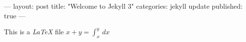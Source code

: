 ---
layout: post
title:  "Welcome to Jekyll 3"
categories: jekyll update
published: true
---


This is a \emph{LaTeX} file $x+y=\int_x^y \, dx$
